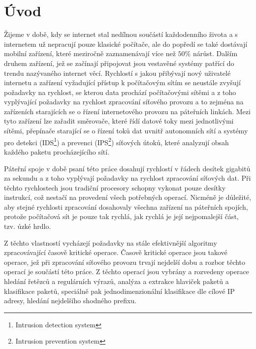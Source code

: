 
\chapter{Úvod} %

Žijeme v době, kdy se internet stal nedílnou součástí každodenního života a s internetem už nepracují
pouze klasické počítače, ale do popředí se také dostávají mobilní zařízení, které meziročně
zaznamenávají více než $50\%$ nárůst. Dalším druhem zařízení, jež se začínají připojovat
jsou vestavěné systémy patřící do trendu nazývaného internet věcí.
Rychlostí s jakou přibývají nový uživatelé internetu a zařízení vyžadující přístup k počítačovým sítím
se neustále zvyšují požadavky na rychlost, se kterou data prochází počítačovými
sítěmi a z toho vyplývající požadavky na rychlost zpracování síťového provozu a to zejména na zařízeních
starajících se o řízení internetového provozu na páteřních linkách. Mezi tyto
zařízení lze zařadit směrovače, které řídí datové toky mezi jednotlivými sítěmi,
přepínače starající se o řízení toků dat uvnitř autonomních sítí a
systémy pro detekci (IDS\footnote{Intrusion detection system}) a prevenci (IPS\footnote{Intrusion prevention system})
síťových útoků, které analyzují obsah každého paketu procházejícího sítí.

Páteřní spoje v době psaní této práce dosahují rychlostí v řádech desítek gigabitů
za sekundu a z toho vyplývají požadavky na rychlost zpracování síťových dat. Při těchto rychlostech
jsou tradiční procesory schopny vykonat pouze desítky instrukcí, což nestačí na provedení všech potřebných
operací. Nicméně je důležité, aby stejné rychlosti zpracování dosahovaly všechna zařízení na páteřních spojích,
protože počítačová sít je pouze tak rychlá, jak rychlá je její nejpomalejší část, tzv. úzké hrdlo.

Z těchto vlastností vycházejí požadavky na stále efektivnější algoritmy zpracovávající časově kritické operace.
Časově kritické operace jsou takové operace, jež při zpracování síťového provozu trvají nejdelší dobu a rozbor
těchto operací je součástí této práce. Z těchto operací jsou vybrány a rozvedeny operace
hledání řetězců a regulárních výrazů, analýza a extrakce hlaviček paketů a klasifikace paketů, speciálně pak jednodimenzionální klasifikace dle cílové IP adresy, hledání nejdelšího shodného prefixu.

